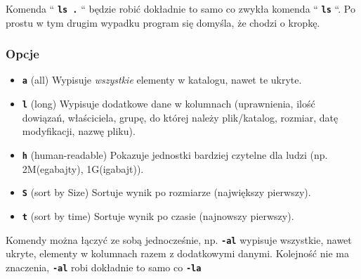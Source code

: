 \documentclass[12pt]{article}
\newcommand{\ttbf}[1]{
    \texttt{\textbf{#1}}
}
\begin{document}
\hfill

Komenda ``\ttbf{ls .}`` będzie robić dokładnie to samo co zwykła komenda ``\ttbf{ls}``. Po prostu w tym drugim wypadku program się domyśla, że chodzi o kropkę.

\subsubsection{Opcje}
\begin{itemize}
    \item \ttbf{a} (all) Wypisuje \emph{wszystkie} elementy w katalogu, nawet te ukryte.
    \item \ttbf{l} (long) Wypisuje dodatkowe dane w kolumnach (uprawnienia, ilość dowiązań, właściciela, grupę, do której należy plik/katalog, rozmiar, datę modyfikacji, nazwę pliku).
    \item \ttbf{h} (human-readable) Pokazuje jednostki bardziej czytelne dla ludzi (np. 2M(egabajty), 1G(igabajt)).
    \item \ttbf{S} (sort by Size) Sortuje wynik po rozmiarze (największy pierwszy).
    \item \ttbf{t} (sort by time) Sortuje wynik po czasie (najnowszy pierwszy).
\end{itemize}

Komendy można łączyć ze sobą jednocześnie, np. \ttbf{-al} wypisuje wszystkie, nawet ukryte, elementy w kolumnach razem z dodatkowymi danymi. Kolejność nie ma znaczenia, \ttbf{-al} robi dokładnie to samo co \ttbf{-la}
\end{document}

